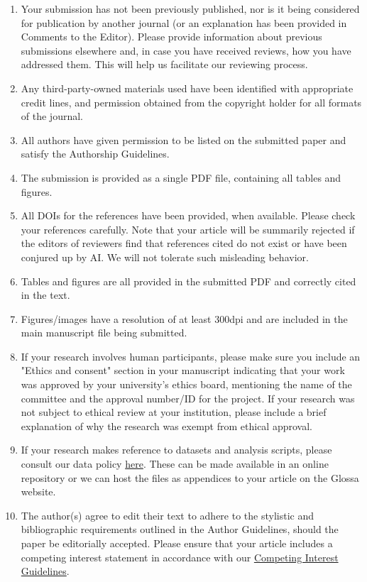 \documentclass[charis,linguex]{glossa}
\begin{document}
\begin{enumerate}[label=\arabic*.]
\item Your submission has not been previously published, nor is it being considered for publication by another journal (or an explanation has been provided in Comments to the Editor). Please provide information about previous submissions elsewhere and, in case you have received reviews, how you have addressed them. This will help us facilitate our reviewing process.
\item Any third-party-owned materials used have been identified with appropriate credit lines, and permission obtained from the copyright holder for all formats of the journal.
\item All authors have given permission to be listed on the submitted paper and satisfy the Authorship Guidelines.
\item The submission is provided as a single PDF file, containing all tables and figures.
\item All DOIs for the references have been provided, when available. Please check your references carefully. Note that your article will be summarily rejected if the editors of reviewers find that references cited do not exist or have been conjured up by AI. We will not tolerate such misleading behavior.
\item Tables and figures are all provided in the submitted PDF and correctly cited in the text.
\item Figures/images have a resolution of at least 300dpi and are included in the main manuscript file being submitted.
\item If your research involves human participants, please make sure you include an "Ethics and consent" section in your manuscript indicating that your work was approved by your university's ethics board, mentioning the name of the committee and the approval number/ID for the project. If your research was not subject to ethical review at your institution, please include a brief explanation of why the research was exempt from ethical approval.
\item If your research makes reference to datasets and analysis scripts, please consult our data policy \href{https://www.glossa-journal.org/site/journal-policies/}{here}. These can be made available in an online repository or we can host the files as appendices to your article on the Glossa website.
\item The author(s) agree to edit their text to adhere to the stylistic and bibliographic requirements outlined in the Author Guidelines, should the paper be editorially accepted. Please ensure that your article includes a competing interest statement in accordance with our \href{https://www.glossa-journal.org/site/competing-interests/}{Competing Interest Guidelines}.

\end{enumerate}
\end{document}
